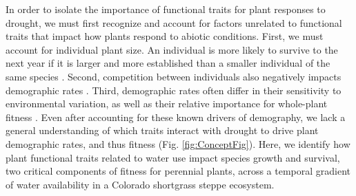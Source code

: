 \documentclass[12pt, letterpaper]{article}
\begin{document}
In order to isolate the importance of functional traits for plant responses to drought, we must first recognize and account for factors unrelated to functional traits that impact how plants respond to abiotic conditions. First, we must account for individual plant size. An individual is more likely to survive to the next year if it is larger and more established than a smaller individual of the same species \citep{Tredennick2017}. Second, competition between individuals also negatively impacts demographic rates \citep{Adler2012}. Third, demographic rates often differ in their sensitivity to environmental variation, as well as their relative importance for whole-plant fitness \citep{Laughlin2020TheFitness,Dibner2019}. Even after accounting for these known drivers of demography, we lack a general understanding of which traits interact with drought to drive plant demographic rates, and thus fitness \citep{Laughlin2018,Laughlin2020TheFitness}(Fig. \ref{fig:ConceptFig}). Here, we identify how plant functional traits related to water use impact species growth and survival, two critical components of fitness for perennial plants, across a temporal gradient of water availability in a Colorado shortgrass steppe ecosystem. 

\end{document}
